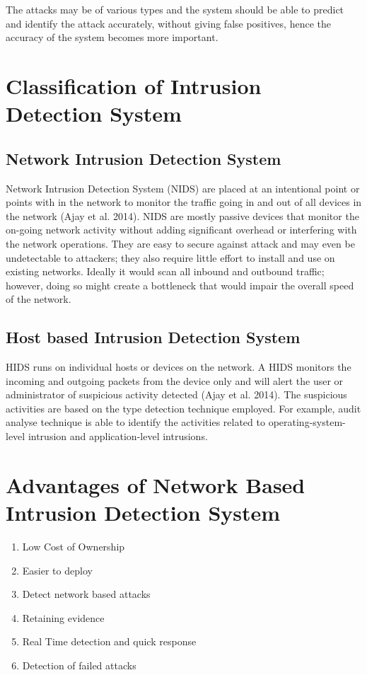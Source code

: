 \documentclass[12pt, a4paper]{report}
\begin{document}
The attacks may be of various types and the system should be able to predict and identify the attack accurately, without giving false positives, hence the accuracy of the system becomes more important. \\ \par

\section{Classification of Intrusion Detection System}
\subsection{Network Intrusion Detection System}
Network Intrusion Detection System (NIDS) are placed at an intentional point or points with in the network to monitor the traffic going in and out of all devices in the network (Ajay et al. 2014). NIDS are mostly passive devices that monitor the on-going network activity without adding significant overhead or interfering with the network operations. They are easy to secure against attack and may even be undetectable to attackers; they also require little effort to install and use on existing networks. Ideally it would scan all inbound and outbound traffic; however, doing so might create a bottleneck that would impair the overall speed of the network.

\subsection{Host based Intrusion Detection System}
HIDS runs on individual hosts or devices on the network. A HIDS monitors the incoming and outgoing packets from the device only and will alert the user or administrator of suspicious activity detected (Ajay et al. 2014). The suspicious activities are based on the type detection technique employed. For example, audit analyse  technique is able to identify the activities related to operating-system-level intrusion and application-level intrusions.

\section{Advantages of Network Based Intrusion Detection System}\label{sec:advantagesofNIDS}
\begin{enumerate}
	\item {Low Cost of Ownership}
	\item {Easier to deploy}
	\item {Detect network based attacks}
	\item {Retaining evidence}
	\item {Real Time detection and quick response}
	\item {Detection of failed attacks}
\end{enumerate}
\end{document}
